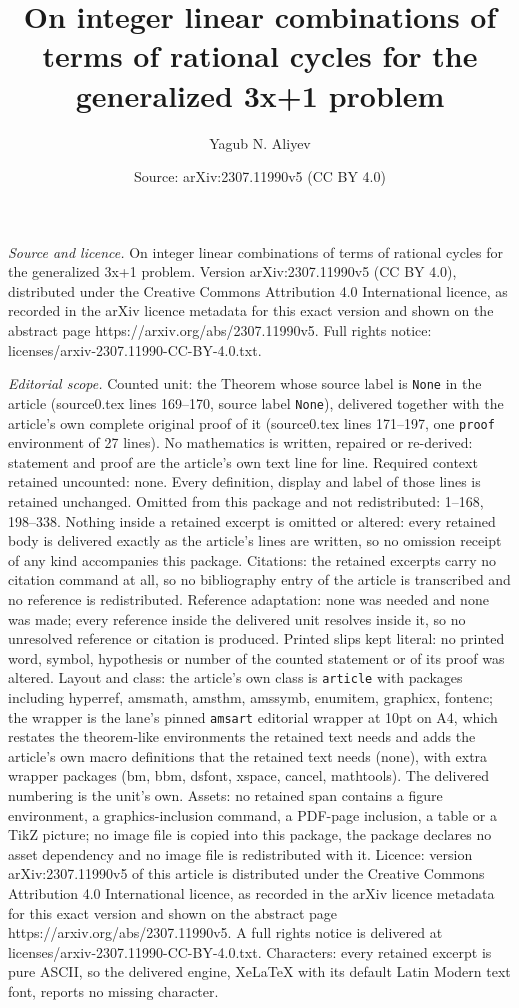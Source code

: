 \documentclass[10pt,a4paper]{amsart}
\title[On integer linear combinations of terms of rational cycles f]{On integer linear combinations of terms of rational cycles for the generalized 3x+1 problem}
\author{Yagub N. Aliyev}
\date{Source: arXiv:2307.11990v5 (CC BY 4.0)}
\begin{document}
\maketitle

\noindent\emph{Source and licence.} On integer linear combinations of terms of rational cycles for the generalized 3x+1 problem. Version arXiv:2307.11990v5 (CC BY 4.0), distributed under the Creative Commons Attribution 4.0 International licence, as recorded in the arXiv licence metadata for this exact version and shown on the abstract page https://arxiv.org/abs/2307.11990v5. Full rights notice: licenses/arxiv-2307.11990-CC-BY-4.0.txt.\par\smallskip

\noindent\textit{Editorial scope.} Counted unit: the Theorem whose source label is \texttt{None} in the article (source0.tex lines 169--170, source label \texttt{None}), delivered together with the article's own complete original proof of it (source0.tex lines 171--197, one \texttt{proof} environment of 27 lines). No mathematics is written, repaired or re-derived: statement and proof are the article's own text line for line. Required context retained uncounted: none. Every definition, display and label of those lines is retained unchanged. Omitted from this package and not redistributed: 1--168, 198--338. Nothing inside a retained excerpt is omitted or altered: every retained body is delivered exactly as the article's lines are written, so no omission receipt of any kind accompanies this package. Citations: the retained excerpts carry no citation command at all, so no bibliography entry of the article is transcribed and no reference is redistributed. Reference adaptation: none was needed and none was made; every reference inside the delivered unit resolves inside it, so no unresolved reference or citation is produced. Printed slips kept literal: no printed word, symbol, hypothesis or number of the counted statement or of its proof was altered. Layout and class: the article's own class is \texttt{article} with packages including hyperref, amsmath, amsthm, amssymb, enumitem, graphicx, fontenc; the wrapper is the lane's pinned \texttt{amsart} editorial wrapper at 10pt on A4, which restates the theorem-like environments the retained text needs and adds the article's own macro definitions that the retained text needs (none), with extra wrapper packages (bm, bbm, dsfont, xspace, cancel, mathtools). The delivered numbering is the unit's own. Assets: no retained span contains a figure environment, a graphics-inclusion command, a PDF-page inclusion, a table or a TikZ picture; no image file is copied into this package, the package declares no asset dependency and no image file is redistributed with it. Licence: version arXiv:2307.11990v5 of this article is distributed under the Creative Commons Attribution 4.0 International licence, as recorded in the arXiv licence metadata for this exact version and shown on the abstract page https://arxiv.org/abs/2307.11990v5. A full rights notice is delivered at licenses/arxiv-2307.11990-CC-BY-4.0.txt. Characters: every retained excerpt is pure ASCII, so the delivered engine, XeLaTeX with its default Latin Modern text font, reports no missing character.
\end{document}
